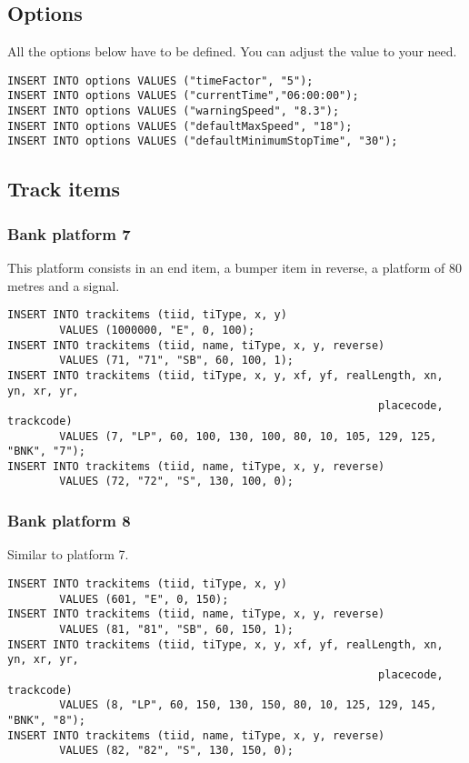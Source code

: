 \documentclass[12pt,a4paper]{article}
\begin{document}
\subsection{Options}

All the options below have to be defined. You can adjust the value to your need.

\begin{verbatim}
INSERT INTO options VALUES ("timeFactor", "5");
INSERT INTO options VALUES ("currentTime","06:00:00");
INSERT INTO options VALUES ("warningSpeed", "8.3");
INSERT INTO options VALUES ("defaultMaxSpeed", "18");
INSERT INTO options VALUES ("defaultMinimumStopTime", "30");
\end{verbatim}

\subsection{Track items}

\subsubsection{Bank platform 7}
This platform consists in an end item, a bumper item in reverse, a platform of 80 metres and a signal.
\begin{verbatim}
INSERT INTO trackitems (tiid, tiType, x, y)
        VALUES (1000000, "E", 0, 100);
INSERT INTO trackitems (tiid, name, tiType, x, y, reverse)
        VALUES (71, "71", "SB", 60, 100, 1);
INSERT INTO trackitems (tiid, tiType, x, y, xf, yf, realLength, xn, yn, xr, yr,
                                                         placecode, trackcode)
        VALUES (7, "LP", 60, 100, 130, 100, 80, 10, 105, 129, 125, "BNK", "7");
INSERT INTO trackitems (tiid, name, tiType, x, y, reverse)
        VALUES (72, "72", "S", 130, 100, 0);
\end{verbatim}

\subsubsection{Bank platform 8}
Similar to platform 7.
\begin{verbatim}
INSERT INTO trackitems (tiid, tiType, x, y)
        VALUES (601, "E", 0, 150);
INSERT INTO trackitems (tiid, name, tiType, x, y, reverse)
        VALUES (81, "81", "SB", 60, 150, 1);
INSERT INTO trackitems (tiid, tiType, x, y, xf, yf, realLength, xn, yn, xr, yr,
                                                         placecode, trackcode)
        VALUES (8, "LP", 60, 150, 130, 150, 80, 10, 125, 129, 145, "BNK", "8");
INSERT INTO trackitems (tiid, name, tiType, x, y, reverse)
        VALUES (82, "82", "S", 130, 150, 0);
\end{verbatim}
\end{document}
